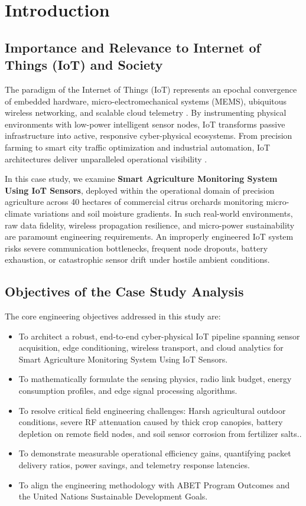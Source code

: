 \section{Introduction}

\subsection{Importance and Relevance to Internet of Things (IoT) and Society}
The paradigm of the Internet of Things (IoT) represents an epochal convergence of embedded hardware, micro-electromechanical systems (MEMS), ubiquitous wireless networking, and scalable cloud telemetry \cite{al2015internet}. By instrumenting physical environments with low-power intelligent sensor nodes, IoT transforms passive infrastructure into active, responsive cyber-physical ecosystems. From precision farming to smart city traffic optimization and industrial automation, IoT architectures deliver unparalleled operational visibility \cite{zanella2014internet}.

In this case study, we examine \textbf{Smart Agriculture Monitoring System Using IoT Sensors}, deployed within the operational domain of precision agriculture across 40 hectares of commercial citrus orchards monitoring micro-climate variations and soil moisture gradients. In such real-world environments, raw data fidelity, wireless propagation resilience, and micro-power sustainability are paramount engineering requirements. An improperly engineered IoT system risks severe communication bottlenecks, frequent node dropouts, battery exhaustion, or catastrophic sensor drift under hostile ambient conditions.

\subsection{Objectives of the Case Study Analysis}
The core engineering objectives addressed in this study are:
\begin{itemize}
  \item To architect a robust, end-to-end cyber-physical IoT pipeline spanning sensor acquisition, edge conditioning, wireless transport, and cloud analytics for Smart Agriculture Monitoring System Using IoT Sensors.
  \item To mathematically formulate the sensing physics, radio link budget, energy consumption profiles, and edge signal processing algorithms.
  \item To resolve critical field engineering challenges: Harsh agricultural outdoor conditions, severe RF attenuation caused by thick crop canopies, battery depletion on remote field nodes, and soil sensor corrosion from fertilizer salts..
  \item To demonstrate measurable operational efficiency gains, quantifying packet delivery ratios, power savings, and telemetry response latencies.
  \item To align the engineering methodology with ABET Program Outcomes and the United Nations Sustainable Development Goals.
\end{itemize}

